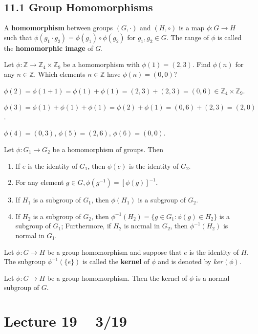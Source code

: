 \documentclass{article}
\newcommand{\Z}{\mathbb{Z}}
\begin{document}
\subsection{11.1 Group Homomorphisms}
A \textbf{homomorphism} between groups $(G,\cdot)$ and $(H,\circ)$ is a map $\phi:G\to H$ such that $\phi(g_1\cdot g_2)=\phi(g_1)\circ\phi(g_2)$ for $g_1,g_2\in G$. The range of $\phi$ is  called the \textbf{homomorphic image} of $G$.
\begin{example}
  Let $\phi:\Z\to\Z_4\times\Z_9$ be a homomorphism with $\phi(1)=(2,3).$ Find $\phi(n)$ for any $n\in\Z$. Which elements $n\in\Z$ have $\phi(n)=(0,0)$?

  $\phi(2)=\phi(1+1)=\phi(1)+\phi(1)=(2,3)+(2,3)=(0,6)\in\Z_4\times\Z_9$.

  $\phi(3)=\phi(1)+\phi(1)+\phi(1)=\phi(2)+\phi(1)=(0,6)+(2,3)=(2,0)$.

  $\phi(4)=(0,3)$, $\phi(5)=(2,6)$, $\phi(6)=(0,0)$.
\end{example}

Let $\phi:G_1\to G_2$ be a homomorphism of groups. Then
\begin{enumerate}
  \item If $e$ is the identity of $G_1$, then $\phi(e)$ is the identity of $G_2$.
  \item For any element $g\in G,\phi(g^{-1})=[\phi(g)]^{-1}$.
  \item If $H_1$ is a subgroup of $G_1$, then $\phi(H_1)$ is a subgroup of $G_2$.
  \item If $H_2$ is a subgroup of $G_2$, then $\phi^{-1}(H_2)=\{g\in G_1:\phi(g)\in H_2\}$ is a subgroup of $G_1$; Furthermore, if $H_2$ is normal in $G_2$, then $\phi^{-1}(H_2)$ is normal in $G_1$.
\end{enumerate}

Let $\phi:G\to H$ be a group homomorphism and suppose that $e$ is the identity of $H$. The subgroup $\phi^{-1}(\{e\})$ is called the \textbf{kernel} of $\phi$ and is denoted by $ker(\phi)$.
\begin{theorem}
  Let $\phi:G\to H$ be a group homomorphism. Then the kernel of $\phi$ is a normal subgroup of $G$.
\end{theorem}
\section{Lecture 19 -- 3/19}
\end{document}
